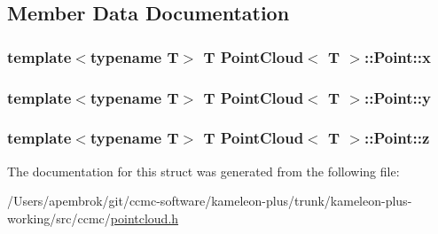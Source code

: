 \subsection{Member Data Documentation}
\hypertarget{struct_point_cloud_1_1_point_a4c9755e331a4b3c82f69bf73573a85cb}{
\subsubsection[{x}]{\setlength{\rightskip}{0pt plus 5cm}template$<$typename T$>$ T {\bf Point\-Cloud}$<$ T $>$\-::Point\-::x}}\label{struct_point_cloud_1_1_point_a4c9755e331a4b3c82f69bf73573a85cb}
\hypertarget{struct_point_cloud_1_1_point_a04e6140b52712a7fcabdb3b8d06040fc}{
\subsubsection[{y}]{\setlength{\rightskip}{0pt plus 5cm}template$<$typename T$>$ T {\bf Point\-Cloud}$<$ T $>$\-::Point\-::y}}\label{struct_point_cloud_1_1_point_a04e6140b52712a7fcabdb3b8d06040fc}
\hypertarget{struct_point_cloud_1_1_point_a606a44d077bc9f483cf6ff58c4896a14}{
\subsubsection[{z}]{\setlength{\rightskip}{0pt plus 5cm}template$<$typename T$>$ T {\bf Point\-Cloud}$<$ T $>$\-::Point\-::z}}\label{struct_point_cloud_1_1_point_a606a44d077bc9f483cf6ff58c4896a14}


The documentation for this struct was generated from the following file\-:\begin{DoxyCompactItemize}
\item 
/\-Users/apembrok/git/ccmc-\/software/kameleon-\/plus/trunk/kameleon-\/plus-\/working/src/ccmc/\hyperlink{pointcloud_8h}{pointcloud.\-h}\end{DoxyCompactItemize}
